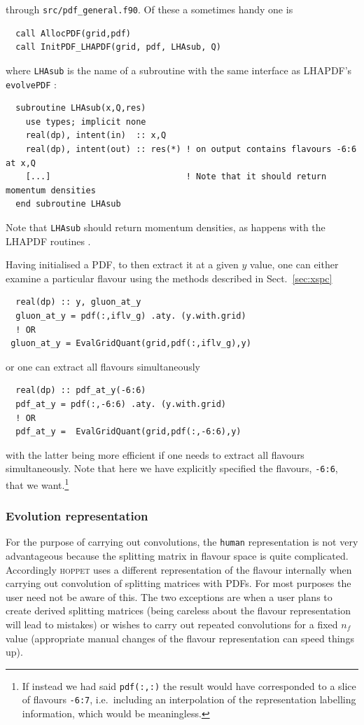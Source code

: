 \documentclass[12pt]{article}
\newcommand{\ie}{i.e.\ }
\newcommand{\hoppet}{\textsc{hoppet}\xspace}
\newcommand{\ttt}[1]{\texttt{#1}}
\begin{document}
through \ttt{src/pdf\_general.f90}. Of these a sometimes handy one is
\begin{lstlisting}
  call AllocPDF(grid,pdf)
  call InitPDF_LHAPDF(grid, pdf, LHAsub, Q)
\end{lstlisting}
where \texttt{LHAsub} is the name of a subroutine 
with the same interface as LHAPDF's \ttt{evolvePDF} \cite{LHAPDF}:
\begin{lstlisting}
  subroutine LHAsub(x,Q,res)
    use types; implicit none
    real(dp), intent(in)  :: x,Q
    real(dp), intent(out) :: res(*) ! on output contains flavours -6:6 at x,Q
    [...]                           ! Note that it should return momentum densities
  end subroutine LHAsub
\end{lstlisting}
Note that {\tt LHAsub} should return momentum densities, as
happens with the LHAPDF routines \cite{LHAPDF}.


Having initialised a PDF, to then extract it at a given $y$ value, one
can either examine a particular flavour using the methods described in
Sect.~\ref{sec:xspc}
\begin{lstlisting}
  real(dp) :: y, gluon_at_y
  gluon_at_y = pdf(:,iflv_g) .aty. (y.with.grid)
  ! OR
 gluon_at_y = EvalGridQuant(grid,pdf(:,iflv_g),y) 
\end{lstlisting}
or one can extract all flavours simultaneously
\begin{lstlisting}
  real(dp) :: pdf_at_y(-6:6)
  pdf_at_y = pdf(:,-6:6) .aty. (y.with.grid)
  ! OR
  pdf_at_y =  EvalGridQuant(grid,pdf(:,-6:6),y) 
\end{lstlisting}
with the latter being more efficient if one needs to extract all
flavours simultaneously. Note that here we have explicitly specified
the flavours, \ttt{-6:6}, that we want.\footnote{If instead we had
  said \ttt{pdf(:,:)} the result would have corresponded to a slice of
  flavours \ttt{-6:7}, \ie including an interpolation of the
  representation labelling information, which would be meaningless.}


\subsubsection{Evolution representation} 
\label{sec:evln-rep}
%
For the purpose of carrying out convolutions, the \ttt{human}
representation is not very advantageous because the splitting matrix
in flavour space is quite complicated. Accordingly \hoppet uses a
different representation of the flavour internally when carrying out
convolution of splitting matrices with PDFs. For most purposes the
user need not be aware of this. The two exceptions are when a user
plans to create derived splitting matrices (being careless about the
flavour representation will lead to mistakes) or wishes to carry out
repeated convolutions for a fixed $n_f$ value (appropriate manual
changes of the flavour representation can speed things up).
\end{document}
